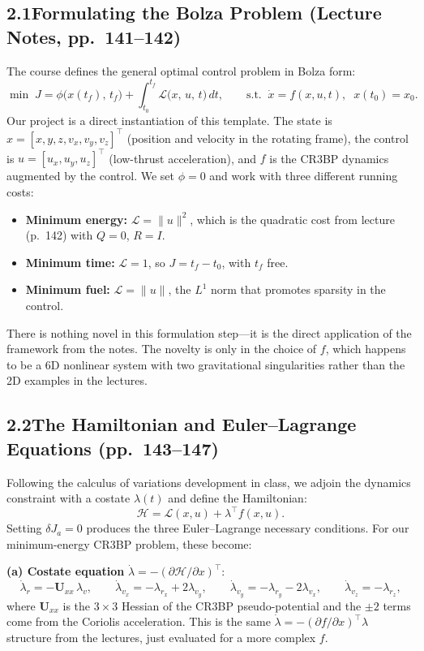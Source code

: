 \documentclass[11pt,letterpaper]{article}
\begin{document}
\subsection{2.1\quad Formulating the Bolza Problem (Lecture Notes, pp.~141--142)}

The course defines the general optimal control problem in Bolza form:
\[
  \min\; J = \phi\bigl(x(t_f),\, t_f\bigr)
           + \int_{t_0}^{t_f} \mathcal{L}\bigl(x,\,u,\,t\bigr)\,dt,
  \qquad
  \text{s.t.}\;\; \dot{x} = f(x,u,t),\;\; x(t_0) = x_0.
\]
Our project is a direct instantiation of this template. The state is $x = [x,y,z,v_x,v_y,v_z]^\top$ (position and velocity in the rotating frame), the control is $u = [u_x,u_y,u_z]^\top$ (low-thrust acceleration), and $f$ is the CR3BP dynamics augmented by the control. We set $\phi = 0$ and work with three different running costs:
\begin{itemize}[leftmargin=1.5em]
  \item \textbf{Minimum energy:} $\mathcal{L} = \|u\|^2$, which is the quadratic cost from lecture (p.~142) with $Q=0$, $R=I$.
  \item \textbf{Minimum time:} $\mathcal{L} = 1$, so $J = t_f - t_0$, with $t_f$ free.
  \item \textbf{Minimum fuel:} $\mathcal{L} = \|u\|$, the $L^1$ norm that promotes sparsity in the control.
\end{itemize}

There is nothing novel in this formulation step---it is the direct application of the framework from the notes. The novelty is only in the choice of $f$, which happens to be a 6D nonlinear system with two gravitational singularities rather than the 2D examples in the lectures.


\subsection{2.2\quad The Hamiltonian and Euler--Lagrange Equations (pp.~143--147)}

Following the calculus of variations development in class, we adjoin the dynamics constraint with a costate $\lambda(t)$ and define the Hamiltonian:
\[
  \mathcal{H} = \mathcal{L}(x,u) + \lambda^\top f(x,u).
\]
Setting $\delta J_a = 0$ produces the three Euler--Lagrange necessary conditions. For our minimum-energy CR3BP problem, these become:

\medskip
\noindent\textbf{(a) Costate equation} $\dot{\lambda} = -(\partial\mathcal{H}/\partial x)^\top$:
\[
  \dot{\lambda}_r = -\mathbf{U}_{xx}\,\lambda_v,
  \qquad
  \dot{\lambda}_{v_x} = -\lambda_{r_x} + 2\lambda_{v_y},
  \qquad
  \dot{\lambda}_{v_y} = -\lambda_{r_y} - 2\lambda_{v_x},
  \qquad
  \dot{\lambda}_{v_z} = -\lambda_{r_z},
\]
where $\mathbf{U}_{xx}$ is the $3\times 3$ Hessian of the CR3BP pseudo-potential and the $\pm 2$ terms come from the Coriolis acceleration. This is the same $\dot{\lambda} = -(\partial f/\partial x)^\top \lambda$ structure from the lectures, just evaluated for a more complex $f$.
\end{document}
